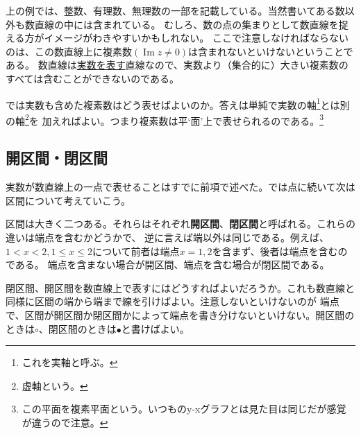 \documentclass[a4j,dvipdfmx]{jsarticle}
\renewcommand{\Im}{\operatorname{Im}}
\begin{document}
            上の例では、整数、有理数、無理数の一部を記載している。当然書いてある数以外も数直線の中には含まれている。
            むしろ、数の点の集まりとして数直線を捉える方がイメージがわきやすいかもしれない。
            ここで注意しなければならないのは、この数直線上に複素数$(\Im z\neq 0)$は含まれないといけないということである。
            数直線は\underline{実数を表す}直線なので、実数より（集合的に）大きい複素数のすべては含むことができないのである。

            では実数も含めた複素数はどう表せばよいのか。答えは単純で実数の軸\footnote{これを実軸と呼ぶ。}とは別の軸\footnote{虚軸という。}を
            加えればよい。つまり複素数は平`面'上で表せられるのである。\footnote{この平面を複素平面という。いつものy-xグラフとは見た目は同じだが感覚が違うので注意。}  
            \newpage
        \subsection{開区間・閉区間}
            実数が数直線上の一点で表せることはすでに前項で述べた。では点に続いて次は区間について考えていこう。

            区間は大きく二つある。それらはそれぞれ\textbf{開区間}、\textbf{閉区間}と呼ばれる。これらの違いは端点を含むかどうかで、
            逆に言えば端以外は同じである。例えば、$1<x<2,1\leq x\leq2$について前者は端点$x=1,2$を含まず、後者は端点を含むのである。
            端点を含まない場合が開区間、端点を含む場合が閉区間である。

            閉区間、開区間を数直線上で表すにはどうすればよいだろうか。これも数直線と同様に区間の端から端まで線を引けばよい。注意しないといけないのが
            端点で、区間が開区間か閉区間かによって端点を書き分けないといけない。開区間のときは$\circ$、閉区間のときは$\bullet$と書けばよい。
\end{document}
